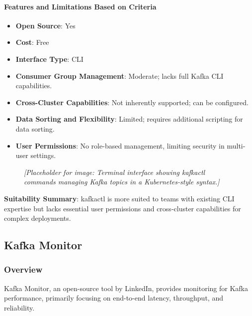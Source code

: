 \documentclass[10pt , a4paper]{report}
\begin{document}
\paragraph{Features and Limitations Based on Criteria}
\begin{itemize} 
    \item \small \textbf{Open Source}: Yes
    \item \small \textbf{Cost}: Free
    \item \small \textbf{Interface Type}: CLI
    \item \small \textbf{Consumer Group Management}: Moderate; lacks full Kafka CLI capabilities.
    \item \small \textbf{Cross-Cluster Capabilities}: Not inherently supported; can be configured.
    \item \small \textbf{Data Sorting and Flexibility}: Limited; requires additional scripting for data sorting.
    \item \small \textbf{User Permissions}: No role-based management, limiting security in multi-user settings.
\end{itemize}

\begin{figure}[h] 
\centering 
\textit{[Placeholder for image: Terminal interface showing kafkactl commands managing Kafka topics in a Kubernetes-style syntax.]} 
\end{figure}

\textbf{Suitability Summary}: kafkactl is more suited to teams with existing CLI expertise but lacks essential user permissions and cross-cluster capabilities for complex deployments.

\subsection{Kafka Monitor} 
\subsubsection*{Overview} 
Kafka Monitor, an open-source tool by LinkedIn, provides monitoring for Kafka performance, primarily focusing on end-to-end latency, throughput, and reliability.
\end{document}
